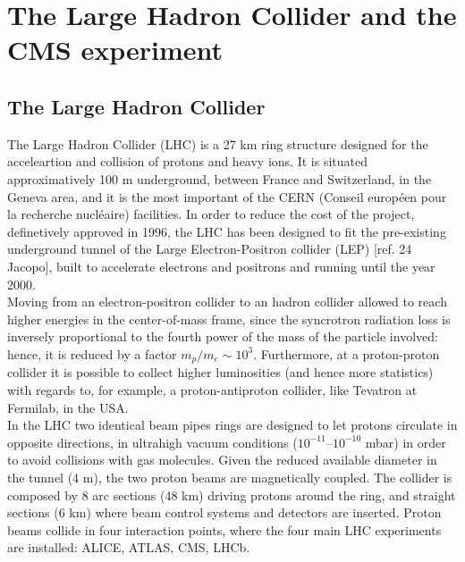 \chapter{The Large Hadron Collider and the CMS experiment}
\label{chap:LHC_CMS}


\section{The Large Hadron Collider}
The Large Hadron Collider (LHC) is a 27 km ring structure designed for the acceleartion and collision of protons and heavy ions. It is situated approximatively 100 m underground, between France and Switzerland, in the Geneva area, and it is the most important of the CERN (Conseil europ\'een pour la recherche nucl\'eaire) facilities. In order to reduce the cost of the project, definetively approved in 1996, the LHC has been designed to fit the pre-existing underground tunnel of the Large Electron-Positron collider (LEP) [ref. 24 Jacopo], built to accelerate electrons and positrons and running until the year 2000.\\
Moving from an electron-positron collider to an hadron collider allowed to reach higher energies in the center-of-mass frame, since the syncrotron radiation loss is inversely proportional to the fourth power of the mass of the particle involved: hence, it is reduced by a factor $m_p/m_e \sim 10^3$. Furthermore, at a proton-proton collider it is possible to collect higher luminosities (and hence more statistics) with regards to, for example, a proton-antiproton collider, like Tevatron at Fermilab, in the USA.\\
In the LHC two identical beam pipes rings are designed to let protons circulate in opposite directions, in ultrahigh vacuum conditions ($10^{-11}$--$10^{-10}$ mbar) in order to avoid collisions with gas molecules. Given the reduced available diameter in the tunnel (4 m), the two proton beams are magnetically coupled. The collider is composed by 8 arc sections (48 km) driving protons around the ring, and straight sections (6 km) where beam control systems and detectors are inserted. Proton beams collide in four interaction points, where the four main LHC experiments are installed: ALICE, ATLAS, CMS, LHCb.

